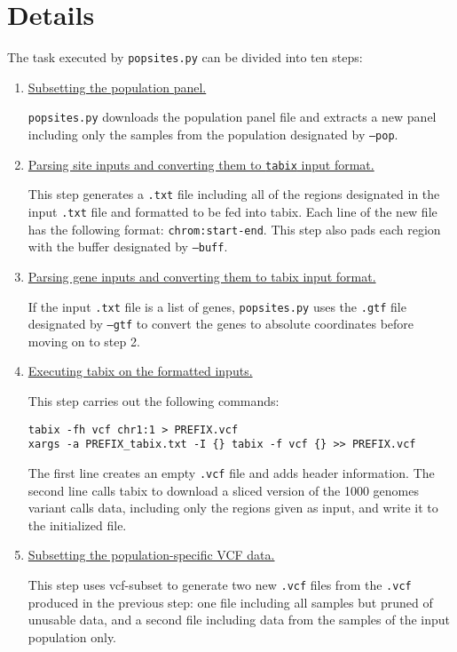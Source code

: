 \documentclass[12pt]{scrartcl}
\begin{document}
\section{Details}

The task executed by \texttt{pop{\textunderscore}sites.py} can be divided into ten steps:

\begin{enumerate}
\item \underline{Subsetting the population panel.}

\texttt{pop{\textunderscore}sites.py} downloads the population panel file and extracts a new panel including only the samples from the population designated by \texttt{--pop}.

\item \underline{Parsing site inputs and converting them to \texttt{tabix} input format.}

This step generates a \texttt{.txt} file including all of the regions designated in the input \texttt{.txt} file and formatted to be fed into tabix. Each line of the new file has the following format: \texttt{chrom:start-end}. This step also pads each region with the buffer designated by \texttt{--buff}.

\item \underline{Parsing gene inputs and converting them to tabix input format.}

If the input \texttt{.txt} file is a list of genes, \texttt{pop{\textunderscore}sites.py} uses the \texttt{.gtf} file designated by \texttt{--gtf} to convert the genes to absolute coordinates before moving on to step 2.

\item \underline{Executing tabix on the formatted inputs.}

This step carries out the following commands:
\begin{verbatim}
tabix -fh vcf chr1:1 > PREFIX.vcf
xargs -a PREFIX_tabix.txt -I {} tabix -f vcf {} >> PREFIX.vcf
\end{verbatim}
The first line creates an empty \texttt{.vcf} file and adds header information. The second line calls tabix to download a sliced version of the 1000 genomes variant calls data, including only the regions given as input, and write it to the initialized file.

\item \underline{Subsetting the population-specific VCF data.}

This step uses vcf-subset to generate two new \texttt{.vcf} files from the \texttt{.vcf} produced in the previous step: one file including all samples but pruned of unusable data, and a second file including data from the samples of the input population only. 


\end{enumerate}
\end{document}
